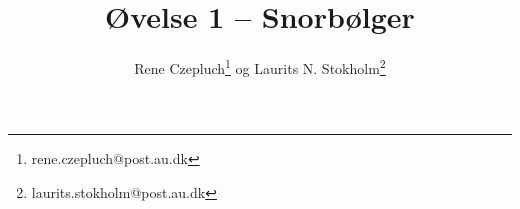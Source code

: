 \documentclass[danish,a4paper,twocolumn, oneside]{memoir}
\title{Øvelse 1 – Snorbølger}
\author{Rene Czepluch\thanks{rene.czepluch@post.au.dk} og Laurits N. Stokholm\thanks{laurits.stokholm@post.au.dk}}
\date
\begin{document}
\maketitle
\noindent







\end{document}
